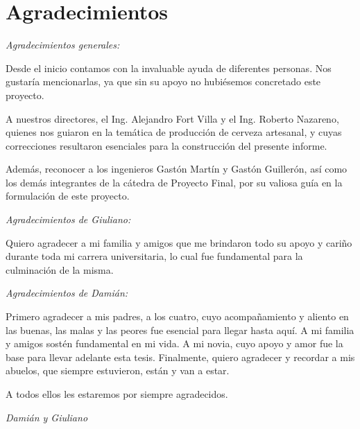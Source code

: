 \chapter{Agradecimientos}

\textit{Agradecimientos generales:}
\par Desde el inicio contamos con la invaluable ayuda de diferentes personas. Nos gustaría mencionarlas, ya que sin su apoyo no hubiésemos concretado este proyecto.

\par A nuestros directores, el Ing. Alejandro Fort Villa y el Ing. Roberto Nazareno, quienes nos guiaron en la temática de producción de cerveza artesanal, y cuyas correcciones resultaron esenciales para la construcción del presente informe.

\par Además, reconocer a los ingenieros Gastón Martín y Gastón Guillerón, así como los demás integrantes de la cátedra de Proyecto Final, por su valiosa guía en la formulación de este proyecto.

\textit{Agradecimientos de Giuliano:}
\par Quiero agradecer a mi familia y amigos que me brindaron todo su apoyo y cariño durante toda mi carrera universitaria, lo cual fue fundamental para la culminación de la misma.


\textit{Agradecimientos de Damián:}
\par Primero agradecer a mis padres, a los cuatro, cuyo acompañamiento y aliento en las buenas, las malas y las peores fue esencial para llegar hasta aquí. A mi familia y amigos sostén fundamental en mi vida. A mi novia, cuyo apoyo y amor fue la base para llevar adelante esta tesis. Finalmente, quiero agradecer y recordar a mis abuelos, que siempre estuvieron, están y van a estar.

\par A todos ellos les estaremos por siempre agradecidos.
\begin{center}
    \textit{Damián y Giuliano}
\end{center}
